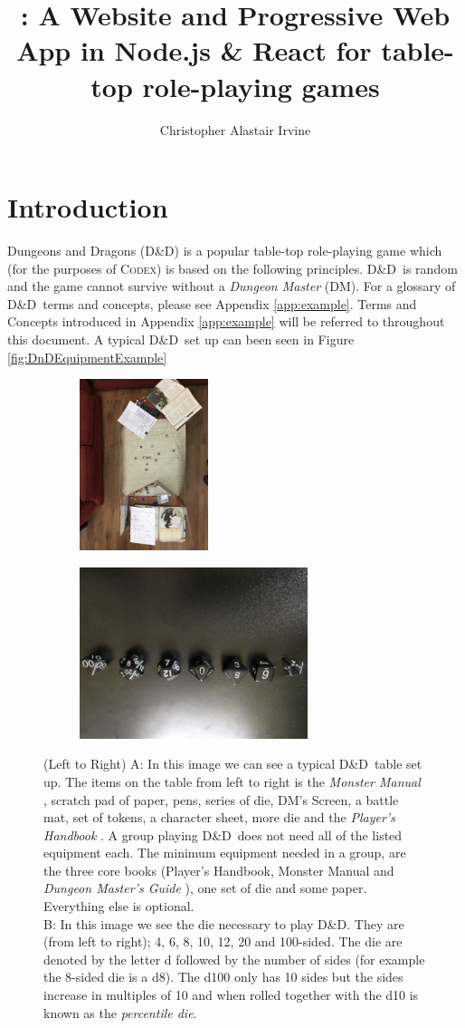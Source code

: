 \documentclass[progress]{cmpreport}
\title{\Codex: A Website and Progressive Web App in Node.js \& React for table-top role-playing games}
\author{Christopher Alastair Irvine}
\newcommand{\dnd}{D\&D}
\newcommand{\Codex}{\textsc{Codex}}
\begin{document}
	\section{Introduction} \label{sec:intro}
	Dungeons and Dragons (\dnd) is a popular table-top role-playing game which (for the purposes of \Codex) is based on the following principles. \dnd \ is random and the game cannot survive without a \emph{Dungeon Master} (DM). For a glossary of \dnd \ terms and concepts, please see Appendix \ref{app:example}. Terms and Concepts introduced in Appendix \ref{app:example} will be referred to throughout this document. A typical \dnd \ set up can been seen in Figure \ref{fig:DnDEquipmentExample}
	
	\begin{figure}
		\begin{subfigure}{0.5\textwidth}
			\includegraphics[width=1\linewidth, height=5cm, angle=180]{DnD_Live.jpg}
			\label{DnDLive}
		\end{subfigure}
		\begin{subfigure}{0.5\textwidth}
			\includegraphics[width=1\linewidth, height=5cm, angle=180]{DnD_Dice.jpg}
			\label{DnDDice}
		\end{subfigure}
		\caption{(Left to Right) A: In this image we can see a typical \dnd \ table set up. The items on the table from left to right is the \emph{Monster Manual} \citep{MonsterManual}, scratch pad of paper, pens, series of die, DM's Screen, a battle mat, set of tokens, a character sheet, more die and the \emph{Player's Handbook} \citep{PlayerHandbook}. A group playing \dnd \ does not need all of the listed equipment each. The minimum equipment needed in a group, are the three core books (Player's Handbook, Monster Manual and \emph{Dungeon Master's Guide} \citep{DMGuide}), one set of die and some paper. Everything else is optional. \\ B: In this image we see the die necessary to play \dnd. They are (from left to right); 4, 6, 8, 10, 12, 20 and 100-sided. The die are denoted by the letter d followed by the number of sides (for example the 8-sided die is a d8). The d100 only has 10 sides but the sides increase in multiples of 10 and when rolled together with the d10 is known as the \emph{percentile die}.}

\end{figure}
\end{document}
